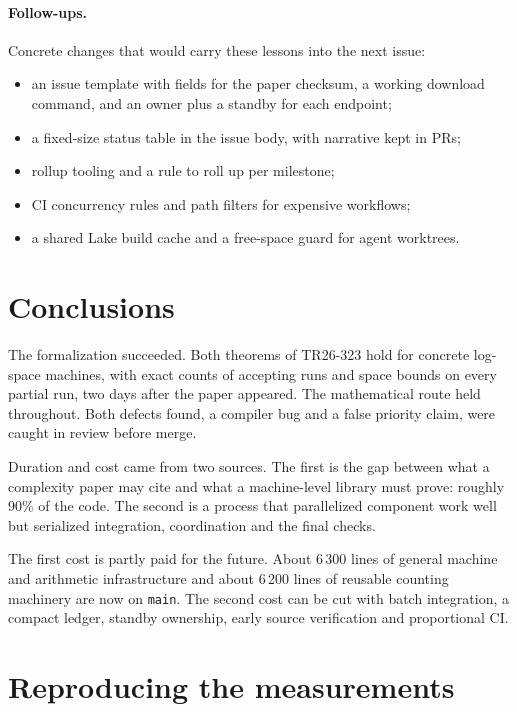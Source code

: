 \documentclass[11pt]{article}
\newcommand{\code}[1]{\texttt{\small #1}}
\begin{document}
\paragraph{Follow-ups.} Concrete changes that would carry these lessons into the next issue:
\begin{itemize}
\item an issue template with fields for the paper checksum, a working download command, and an
owner plus a standby for each endpoint;
\item a fixed-size status table in the issue body, with narrative kept in PRs;
\item rollup tooling and a rule to roll up per milestone;
\item CI concurrency rules and path filters for expensive workflows;
\item a shared Lake build cache and a free-space guard for agent worktrees.
\end{itemize}

\section{Conclusions}

The formalization succeeded. Both theorems of TR26-323 hold for concrete log-space machines, with
exact counts of accepting runs and space bounds on every partial run, two days after the paper
appeared. The mathematical route held throughout. Both defects found, a compiler bug and a false
priority claim, were caught in review before merge.

Duration and cost came from two sources. The first is the gap between what a complexity paper may
cite and what a machine-level library must prove: roughly 90\% of the code. The second is a
process that parallelized component work well but serialized integration, coordination and the
final checks.

The first cost is partly paid for the future. About 6\,300 lines of general machine and arithmetic
infrastructure and about 6\,200 lines of reusable counting machinery are now on \code{main}. The
second cost can be cut with batch integration, a compact ledger, standby ownership, early source
verification and proportional CI.

\appendix
\section{Reproducing the measurements}
\end{document}
